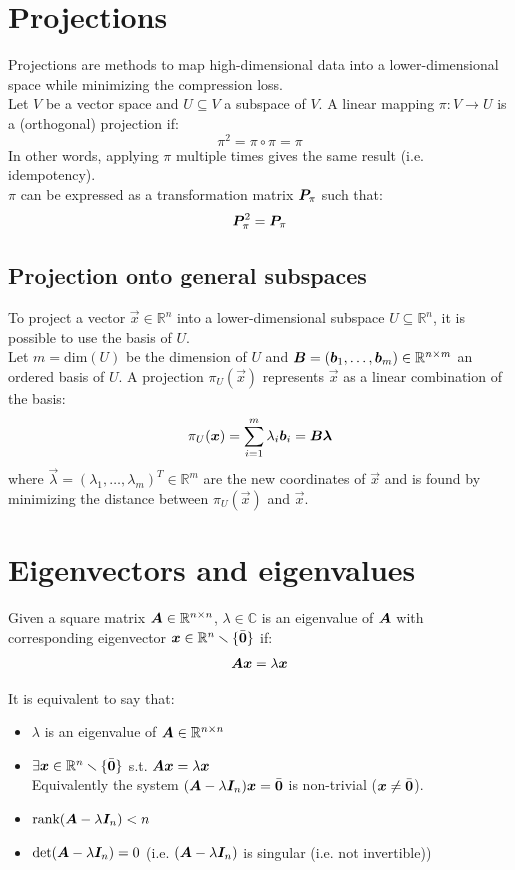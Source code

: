 \section{Projections}
Projections are methods to map high-dimensional data into a lower-dimensional space 
while minimizing the compression loss.\\
Let $V$ be a vector space and $U \subseteq V$ a subspace of $V$.
A linear mapping $\pi: V \rightarrow U$ is a (orthogonal) projection if:
\[ \pi^2 = \pi \circ \pi = \pi \]
In other words, applying $\pi$ multiple times gives the same result (i.e. idempotency).\\
$\pi$ can be expressed as a transformation matrix ${\bm{P}}_\pi$ such that:
\[ {\bm{P}}_\pi^2 = {\bm{P}}_\pi \] 

\subsection{Projection onto general subspaces} 
To project a vector $\vec{x} \in \mathbb{R}^n$ into a lower-dimensional subspace $U \subseteq \mathbb{R}^n$,
it is possible to use the basis of $U$.\\
%
Let $m = \text{dim}(U)$ be the dimension of $U$ and 
${\bm{B}} = ({\bm{b}}_1, \dots, {\bm{b}}_m) \in \mathbb{R}^{n \times m}$ an ordered basis of $U$.
A projection $\pi_U(\vec{x})$ represents $\vec{x}$ as a linear combination of the basis:
\[ \pi_U({\bm{x}}) = \sum_{i=1}^{m} \lambda_i {\bm{b}}_i = {\bm{B}}{\bm{\lambda}} \]
where $\vec{\lambda} = (\lambda_1, \dots, \lambda_m)^T \in \mathbb{R}^{m}$ are the new coordinates of $\vec{x}$ 
and is found by minimizing the distance between $\pi_U(\vec{x})$ and $\vec{x}$.



\section{Eigenvectors and eigenvalues}

Given a square matrix ${\bm{A}} \in \mathbb{R}^{n \times n}$, 
$\lambda \in \mathbb{C}$ is an eigenvalue of ${\bm{A}}$ 
with corresponding eigenvector ${\bm{x}} \in \mathbb{R}^n \smallsetminus \{ \bar{{\bm{0}}} \}$ if: 
\[ {\bm{A}}{\bm{x}} = \lambda{\bm{x}} \]

It is equivalent to say that:
\begin{itemize}
    \item $\lambda$ is an eigenvalue of ${\bm{A}} \in \mathbb{R}^{n \times n}$
    \item $\exists {\bm{x}} \in \mathbb{R}^n \smallsetminus \{ \bar{{\bm{0}}} \}$ s.t. ${\bm{A}}{\bm{x}} = \lambda{\bm{x}}$ \\
        Equivalently the system $({\bm{A}} - \lambda {\bm{I}}_n){\bm{x}} = \bar{{\bm{0}}}$ is non-trivial (${\bm{x}} \neq \bar{{\bm{0}}}$).
    \item $\text{rank}({\bm{A}} - \lambda {\bm{I}}_n) < n$
    \item $\det({\bm{A}} - \lambda {\bm{I}}_n) = 0$ (i.e. $({\bm{A}} - \lambda {\bm{I}}_n)$ is singular {\footnotesize(i.e. not invertible)})
\end{itemize}

